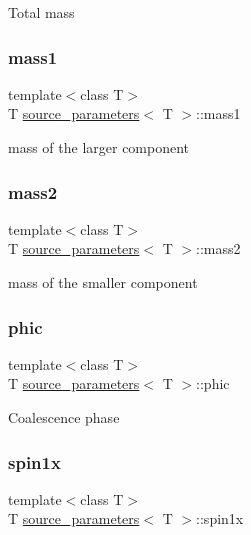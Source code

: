 Total mass \mbox{\label{structsource__parameters_a1a222ddfbc43359da566d085d92e7b72}} 
\subsubsection{\texorpdfstring{mass1}{mass1}}
{\footnotesize\ttfamily template$<$class T$>$ \\
T \hyperlink{structsource__parameters}{source\+\_\+parameters}$<$ T $>$\+::mass1}

mass of the larger component \mbox{\label{structsource__parameters_a889d5e8ae96cec656504784f19916b5d}} 
\subsubsection{\texorpdfstring{mass2}{mass2}}
{\footnotesize\ttfamily template$<$class T$>$ \\
T \hyperlink{structsource__parameters}{source\+\_\+parameters}$<$ T $>$\+::mass2}

mass of the smaller component \mbox{\label{structsource__parameters_a60cbeb524afa4f18cc5c47b0b43c3c18}} 
\subsubsection{\texorpdfstring{phic}{phic}}
{\footnotesize\ttfamily template$<$class T$>$ \\
T \hyperlink{structsource__parameters}{source\+\_\+parameters}$<$ T $>$\+::phic}

Coalescence phase \mbox{\label{structsource__parameters_a7112cbffca6f374199399cb2a4676440}} 
\subsubsection{\texorpdfstring{spin1x}{spin1x}}
{\footnotesize\ttfamily template$<$class T$>$ \\
T \hyperlink{structsource__parameters}{source\+\_\+parameters}$<$ T $>$\+::spin1x}

